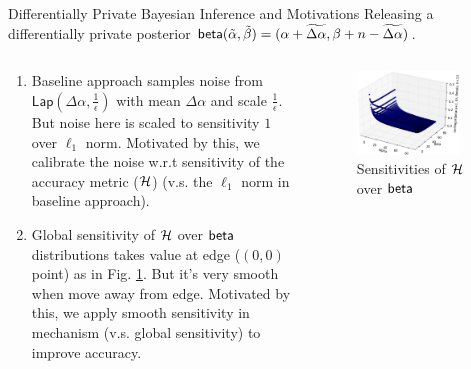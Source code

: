\documentclass[final,hyperref={pdfpagelabels=false}]{beamer}
\begin{document}
\begin{frame}[t]
\begin{columns}[t]
\begin{column}{.485\textwidth}
\begin{block}{Differentially Private Bayesian Inference and Motivations}
Releasing a differentially private posterior $\mathsf{beta} (\tilde\alpha,\tilde\beta)=(\alpha +  \widetilde{\Delta \alpha},\beta + n - \widetilde{\Delta \alpha})$.
\begin{columns} %
\begin{column}{.69\textwidth}
\begin{enumerate}
  \item  Baseline approach samples noise from $\mathsf{Lap}(\Delta \alpha, \frac{1}{\epsilon})$ with mean $\Delta \alpha$ and scale $\frac{1}{\epsilon}$. But noise here is scaled to sensitivity $1$ over $\ell_1$ norm. Motivated by this, we calibrate the noise w.r.t sensitivity of the accuracy metric ($\mathcal{H}$) (v.s. the $\ell_1$ norm in baseline approach).
  \item Global sensitivity of $\mathcal{H}$ over $\mathsf{beta}$ distributions takes value at edge ($(0,0)$ point) as in Fig. \ref{fig_sensitivity}. But it's very smooth when move away from edge. Motivated by this, we apply smooth sensitivity in mechanism (v.s. global sensitivity) to improve accuracy.
\end{enumerate}
\end{column}
\begin{column}{.28\textwidth}
\begin{figure}[ht]
\centering
\includegraphics[width=0.9\textwidth]{poster_0.eps}
\caption{\footnotesize{Sensitivities of $\mathcal{H}$ over $\mathsf{beta}$}}
\label{fig_sensitivity}
\end{figure}
\end{column}
\end{columns}


\end{block}
\end{column}
\end{columns}
\end{frame}
\end{document}

